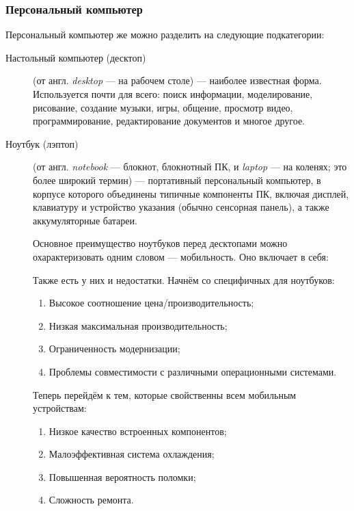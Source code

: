 \subsubsection{Персональный компьютер}\label{base:introduction:computer:classification:pc}
Персональный компьютер же можно разделить на следующие подкатегории:
\begin{description}
 \item[Настольный компьютер (десктоп)] (от англ. \emph{desktop} --- на рабочем столе) --- наиболее известная форма. Используется почти для всего: поиск информации, моделирование, рисование, создание музыки, игры, общение, просмотр видео, программирование, редактирование документов и многое другое.
 \item[Ноутбук (лэптоп)] (от англ. \emph{notebook} --- блокнот, блокнотный ПК, и \emph{laptop} --- на коленях; это более широкий термин) --- портативный персональный компьютер, в корпусе которого объединены типичные компоненты ПК, включая дисплей, клавиатуру и устройство указания (обычно сенсорная панель), а также аккумуляторные батареи.
 
  Основное преимущество ноутбуков перед десктопами можно охарактеризовать одним словом --- мобильность. Оно включает в себя:
  Также есть у них и недостатки. Начнём со специфичных для ноутбуков:
  \begin{enumerate}
   \item Высокое соотношение цена/производительность;
   \item Низкая максимальная производительность;
   \item Ограниченность модернизации;
   \item Проблемы совместимости с различными операционными системами.
  \end{enumerate}   
  Теперь перейдём к тем, которые свойственны всем мобильным уст\-ройствам:
  \begin{enumerate}
   \item Низкое качество встроенных компонентов;
   \item Малоэффективная система охлаждения;
   \item Повышенная вероятность поломки;
   \item Сложность ремонта.
  \end{enumerate}
  

\end{description}
